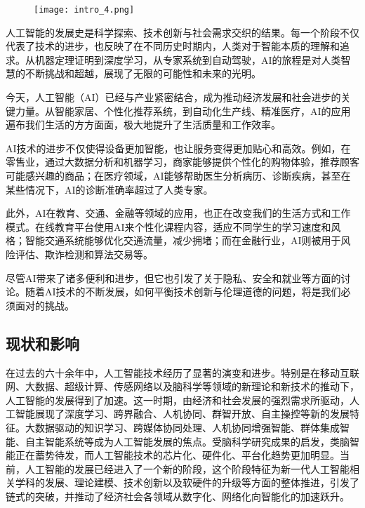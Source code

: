 \begin{figure}[htbp]
	\texttt{[image: intro\_4.png]}
\end{figure}

人工智能的发展史是科学探索、技术创新与社会需求交织的结果。每一个阶段不仅代表了技术的进步，也反映了在不同历史时期内，人类对于智能本质的理解和追求。从机器定理证明到深度学习，从专家系统到自动驾驶，AI的旅程是对人类智慧的不断挑战和超越，展现了无限的可能性和未来的光明。

今天，人工智能（AI）已经与产业紧密结合，成为推动经济发展和社会进步的关键力量。从智能家居、个性化推荐系统，到自动化生产线、精准医疗，AI的应用遍布我们生活的方方面面，极大地提升了生活质量和工作效率。

AI技术的进步不仅使得设备更加智能，也让服务变得更加贴心和高效。例如，在零售业，通过大数据分析和机器学习，商家能够提供个性化的购物体验，推荐顾客可能感兴趣的商品；在医疗领域，AI能够帮助医生分析病历、诊断疾病，甚至在某些情况下，AI的诊断准确率超过了人类专家。

此外，AI在教育、交通、金融等领域的应用，也正在改变我们的生活方式和工作模式。在线教育平台使用AI来个性化课程内容，适应不同学生的学习速度和风格；智能交通系统能够优化交通流量，减少拥堵；而在金融行业，AI则被用于风险评估、欺诈检测和算法交易等。

尽管AI带来了诸多便利和进步，但它也引发了关于隐私、安全和就业等方面的讨论。随着AI技术的不断发展，如何平衡技术创新与伦理道德的问题，将是我们必须面对的挑战。

\subsection[现状和影响]{现状和影响}

在过去的六十余年中，人工智能技术经历了显著的演变和进步。特别是在移动互联网、大数据、超级计算、传感网络以及脑科学等领域的新理论和新技术的推动下，人工智能的发展得到了加速。这一时期，由经济和社会发展的强烈需求所驱动，人工智能展现了深度学习、跨界融合、人机协同、群智开放、自主操控等新的发展特征。大数据驱动的知识学习、跨媒体协同处理、人机协同增强智能、群体集成智能、自主智能系统等成为人工智能发展的焦点。受脑科学研究成果的启发，类脑智能正在蓄势待发，而人工智能技术的芯片化、硬件化、平台化趋势更加明显。当前，人工智能的发展已经进入了一个新的阶段，这个阶段特征为新一代人工智能相关学科的发展、理论建模、技术创新以及软硬件的升级等方面的整体推进，引发了链式的突破，并推动了经济社会各领域从数字化、网络化向智能化的加速跃升。

